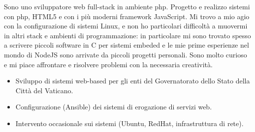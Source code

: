 \documentclass[10pt,a4paper]{altacv}
\begin{document}

\begin{fullwidth}
\makecvheader
\end{fullwidth}

Sono uno sviluppatore web full-stack in ambiente php. Progetto e realizzo sistemi con php, HTML5 e con i più moderni framework JavaScript. Mi trovo a mio agio con la configurazione di sistemi Linux, e non ho particolari difficoltà a muovermi in altri stack e ambienti di programmazione: in particolare mi sono trovato spesso a scrivere piccoli software in C per sistemi embeded e le mie prime esperienze nel mondo di NodeJS sono arrivate da piccoli progetti personali. Sono molto curioso e mi piace affrontare e risolvere problemi con la necessaria creatività.


\begin{itemize}
\item Sviluppo di sistemi web-based per gli enti del Governatorato dello Stato della Città del Vaticano.
\item Configurazione (Ansible) dei sistemi di erogazione di servizi web.
\item Intervento occasionale sui sistemi (Ubuntu, RedHat, infrastruttura di rete).
\end{itemize}

\divider
\end{document}
